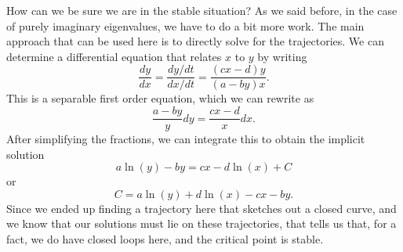How can we be sure we are in the stable situation? 
As we said before, in the case of purely imaginary eigenvalues, we have to
do a bit more work. The main approach that can be used here is to directly solve for the trajectories. We can determine a differential equation that relates $x$ to $y$ by writing
\begin{equation*}
\frac{dy}{dx} = \frac{dy/dt}{dx/dt} = \frac{(cx-d)y}{(a-by)x}.
\end{equation*}
This is a separable first order equation, which we can rewrite as
\begin{equation*}
\frac{a-by}{y} dy = \frac{cx-d}{x} dx.
\end{equation*}
After simplifying the fractions, we can integrate this to obtain the implicit solution
\begin{equation*}
a\ln(y) - by = cx - d\ln(x) + C
\end{equation*}
or
\begin{equation} \label{eq:predPreyTraj} 
C = a\ln(y) + d\ln(x) - cx - by.
\end{equation}
Since we ended up finding a trajectory here that sketches out a closed curve, and we know that our solutions must lie on these trajectories, that tells us that, for a fact, we do have closed loops here, and the critical point is stable. 

